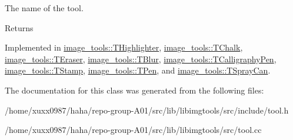 The name of the tool. 

\begin{DoxyReturn}{Returns}

\end{DoxyReturn}


Implemented in \hyperlink{classimage__tools_1_1THighlighter_a741f3c465603450d443f7445ec87c670}{image\+\_\+tools\+::\+T\+Highlighter}, \hyperlink{classimage__tools_1_1TChalk_a74f65065dbc618e5f30089597d39bb46}{image\+\_\+tools\+::\+T\+Chalk}, \hyperlink{classimage__tools_1_1TEraser_a81b041c9389e310fa446fc9e69d2a82f}{image\+\_\+tools\+::\+T\+Eraser}, \hyperlink{classimage__tools_1_1TBlur_a9277f8a68498ab7eb27977ae369d1c69}{image\+\_\+tools\+::\+T\+Blur}, \hyperlink{classimage__tools_1_1TCalligraphyPen_adcc77e8eaf9fbd8d03eeba73f6f51f7b}{image\+\_\+tools\+::\+T\+Calligraphy\+Pen}, \hyperlink{classimage__tools_1_1TStamp_a1a1dec7161830a68bdaefbc0ec567855}{image\+\_\+tools\+::\+T\+Stamp}, \hyperlink{classimage__tools_1_1TPen_ace8f722fce340f23894f12ada93e2e8b}{image\+\_\+tools\+::\+T\+Pen}, and \hyperlink{classimage__tools_1_1TSprayCan_a550d5510cdf8dc826560dcbca9bedbd9}{image\+\_\+tools\+::\+T\+Spray\+Can}.



The documentation for this class was generated from the following files\+:\begin{DoxyCompactItemize}
\item 
/home/xuxx0987/haha/repo-\/group-\/\+A01/src/lib/libimgtools/src/include/tool.\+h\item 
/home/xuxx0987/haha/repo-\/group-\/\+A01/src/lib/libimgtools/src/tool.\+cc\end{DoxyCompactItemize}
